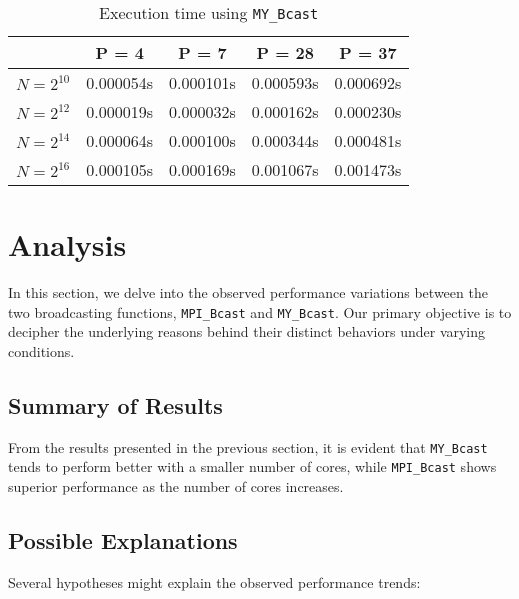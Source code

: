 \documentclass[12pt,a4paper]{article}
\begin{document}
\begin{table}[!htb]
    \centering
    \begin{tabular}{|c|c|c|c|c|}
    \hline
     & P = 4 & P = 7 & P = 28 & P = 37 \\ 
    \hline
    $N = 2^{10}$ & 0.000054s & 0.000101s & 0.000593s & 0.000692s \\ 
    \hline
    $N = 2^{12}$ & 0.000019s & 0.000032s & 0.000162s & 0.000230s \\ 
    \hline
    $N = 2^{14}$ & 0.000064s & 0.000100s & 0.000344s & 0.000481s \\ 
    \hline
    $N = 2^{16}$ & 0.000105s & 0.000169s & 0.001067s & 0.001473s \\ 
    \hline
    \end{tabular}
    \caption{Execution time using \texttt{MY\_Bcast}}
\end{table}
    

\section{Analysis}

In this section, we delve into the observed performance variations between the two broadcasting functions, \texttt{MPI\_Bcast} and \texttt{MY\_Bcast}. Our primary objective is to decipher the underlying reasons behind their distinct behaviors under varying conditions.

\subsection{Summary of Results}
From the results presented in the previous section, it is evident that \texttt{MY\_Bcast} tends to perform better with a smaller number of cores, while \texttt{MPI\_Bcast} shows superior performance as the number of cores increases.

\subsection{Possible Explanations}
Several hypotheses might explain the observed performance trends:
\end{document}
